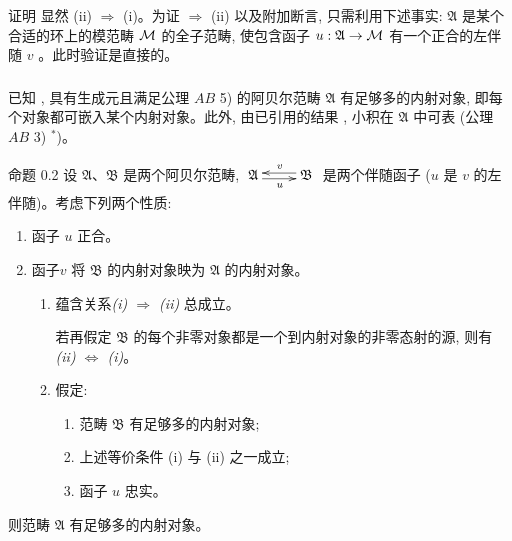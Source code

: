 \begin{enonce*}[remark]{证明}
显然 (ii) $\Rightarrow$ (i)。为证  $\Rightarrow$ (ii) 以及附加断言, 只需利用下述事实: $\mathfrak{A}$ 是某个合适的环上的模范畴 ${\mathcal M}$ 的全子范畴, 使包含函子 $u : \mathfrak{A} \rightarrow {\mathcal M}$ 有一个正合的左伴随 $v$ \cite{sga4.exp.V.bib.5}。此时验证是直接的。
\end{enonce*}

\setcounter{subsection}{1}
\subsubsection{}

已知 \cite{sga4.exp.V.bib.11}, 具有生成元且满足公理 $AB$ 5) 的阿贝尔范畴 $\mathfrak{A}$ 有足够多的内射对象, 即每个对象都可嵌入某个内射对象。此外, 由已引用的结果 \cite{sga4.exp.V.bib.5}, 小积在 $\mathfrak{A}$ 中可表 (公理 $AB$ 3) $^{\ast}$)。

\begin{enonce*}{命题 0.2}
设 $\mathfrak{A}$、$\mathfrak{B}$ 是两个阿贝尔范畴,
$\xymatrix{\mathfrak{A} \ar@<-2pt>[r]_{u}& \mathfrak{B} \ar@<-2pt>[l]_{v}
}
$
是两个伴随函子 ($u$ 是 $v$ 的左伴随)。考虑下列两个性质:
\begin{enumerate}
\renewcommand{\theenumi}{\roman{enumi}}
\renewcommand{\labelenumi}{\theenumi)}
\item 函子 $u$ 正合。

\item 函子\pageoriginale $v$ 将 $\mathfrak{B}$ 的内射对象映为 $\mathfrak{A}$ 的内射对象。
\begin{enumerate}
\renewcommand{\theenumii}{\arabic {enumii}}
\renewcommand{\labelenumii}{\theenumii)}
\item 蕴含关系\emph{(i) $\Rightarrow$ (ii)} 总成立。

若再假定 $\mathfrak{B}$ 的每个非零对象都是一个到内射对象的非零态射的源, 则有\emph{(ii) $\Leftrightarrow$ (i)}。
\item 假定:
\begin{enumerate}
\renewcommand{\theenumiii}{\alph {enumiii}}
\renewcommand{\labelenumiii}{\theenumiii)}
\item 范畴 $\mathfrak{B}$ 有足够多的内射对象;
\item 上述等价条件 {\rm(i)} 与 {\rm(ii)} 之一成立;
\item 函子 $u$ 忠实。
\end{enumerate}
\end{enumerate}
\end{enumerate}
则范畴 $\mathfrak{A}$ 有足够多的内射对象。
\end{enonce*}

